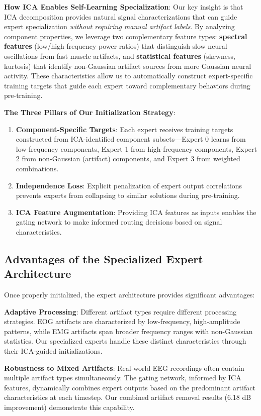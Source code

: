 \documentclass{article}
\begin{document}
\textbf{How ICA Enables Self-Learning Specialization}: Our key insight is that ICA decomposition provides natural signal characterizations that can guide expert specialization \textit{without requiring manual artifact labels}. By analyzing component properties, we leverage two complementary feature types: \textbf{spectral features} (low/high frequency power ratios) that distinguish slow neural oscillations from fast muscle artifacts, and \textbf{statistical features} (skewness, kurtosis) that identify non-Gaussian artifact sources from more Gaussian neural activity. These characteristics allow us to automatically construct expert-specific training targets that guide each expert toward complementary behaviors during pre-training.

\textbf{The Three Pillars of Our Initialization Strategy}:
\begin{enumerate}
\item \textbf{Component-Specific Targets}: Each expert receives training targets constructed from ICA-identified component subsets---Expert 0 learns from low-frequency components, Expert 1 from high-frequency components, Expert 2 from non-Gaussian (artifact) components, and Expert 3 from weighted combinations.
\item \textbf{Independence Loss}: Explicit penalization of expert output correlations prevents experts from collapsing to similar solutions during pre-training.
\item \textbf{ICA Feature Augmentation}: Providing ICA features as inputs enables the gating network to make informed routing decisions based on signal characteristics.
\end{enumerate}

\subsection{Advantages of the Specialized Expert Architecture}

Once properly initialized, the expert architecture provides significant advantages:

\textbf{Adaptive Processing}: Different artifact types require different processing strategies. EOG artifacts are characterized by low-frequency, high-amplitude patterns, while EMG artifacts span broader frequency ranges with non-Gaussian statistics. Our specialized experts handle these distinct characteristics through their ICA-guided initializations.

\textbf{Robustness to Mixed Artifacts}: Real-world EEG recordings often contain multiple artifact types simultaneously. The gating network, informed by ICA features, dynamically combines expert outputs based on the predominant artifact characteristics at each timestep. Our combined artifact removal results (6.18 dB improvement) demonstrate this capability.
\end{document}
